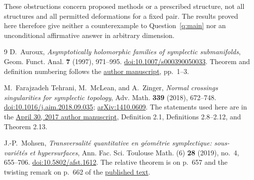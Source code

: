 \documentclass[11pt]{article}
\theoremstyle{definition}
\theoremstyle{remark}
\begin{document}
These obstructions concern proposed methods or a prescribed structure, not all structures and all permitted deformations for a fixed pair. The results proved here therefore give neither a counterexample to Question~\ref{q:main} nor an unconditional affirmative answer in arbitrary dimension.

\begin{thebibliography}{9}
D.~Auroux, \emph{Asymptotically holomorphic families of symplectic submanifolds},
Geom. Funct. Anal. \textbf{7} (1997), 971--995.
\href{https://doi.org/10.1007/s000390050033}{doi:10.1007/s000390050033}.
Theorem and definition numbering follows the
\href{https://people.math.harvard.edu/~auroux/papers/ahsub4.pdf}{author manuscript}, pp.~1--3.

M.~Farajzadeh Tehrani, M.~McLean, and A.~Zinger,
\emph{Normal crossings singularities for symplectic topology},
Adv. Math. \textbf{339} (2018), 672--748.
\href{https://doi.org/10.1016/j.aim.2018.09.035}{doi:10.1016/j.aim.2018.09.035};
\href{https://arxiv.org/abs/1410.0609}{arXiv:1410.0609}.
The statements used here are in the
\href{https://www.math.stonybrook.edu/~azinger/research/SympDivConf.pdf}{April 30, 2017 author manuscript},
Definition 2.1, Definitions 2.8--2.12, and Theorem 2.13.

J.-P.~Mohsen, \emph{Transversalit\'e quantitative en g\'eom\'etrie symplectique:
sous-vari\'et\'es et hypersurfaces},
Ann. Fac. Sci. Toulouse Math. (6) \textbf{28} (2019), no.~4, 655--706.
\href{https://doi.org/10.5802/afst.1612}{doi:10.5802/afst.1612}.
The relative theorem is on p.~657 and the twisting remark on p.~662 of the
\href{https://www.numdam.org/item/10.5802/afst.1612.pdf}{published text}.
\end{thebibliography}
\end{document}
